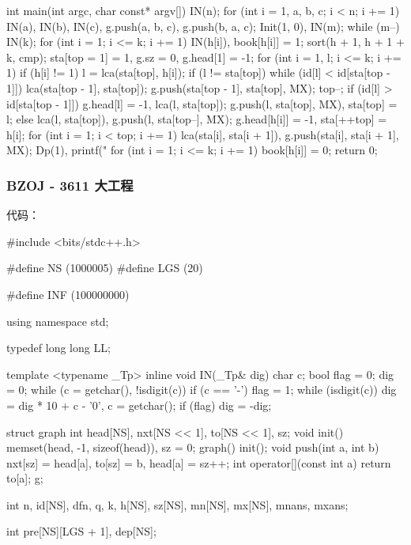 {\begin{cppcode}
int main(int argc, char const* argv[]) {
  IN(n);
  for (int i = 1, a, b, c; i < n; i += 1)
    IN(a), IN(b), IN(c), g.push(a, b, c), g.push(b, a, c);
  Init(1, 0), IN(m);
  while (m--) {
    IN(k);
    for (int i = 1; i <= k; i += 1) IN(h[i]), book[h[i]] = 1;
    sort(h + 1, h + 1 + k, cmp);
    sta[top = 1] = 1, g.sz = 0, g.head[1] = -1;
    for (int i = 1, l; i <= k; i += 1)
      if (h[i] != 1) {
        l = lca(sta[top], h[i]);
        if (l != sta[top]) {
          while (id[l] < id[sta[top - 1]]) {
            lca(sta[top - 1], sta[top]);
            g.push(sta[top - 1], sta[top], MX);
            top--;
          }
          if (id[l] > id[sta[top - 1]]) {
            g.head[l] = -1, lca(l, sta[top]);
            g.push(l, sta[top], MX), sta[top] = l;
          } else
            lca(l, sta[top]), g.push(l, sta[top--], MX);
        }
        g.head[h[i]] = -1, sta[++top] = h[i];
      }
    for (int i = 1; i < top; i += 1)
      lca(sta[i], sta[i + 1]), g.push(sta[i], sta[i + 1], MX);
    Dp(1), printf("%
    for (int i = 1; i <= k; i += 1) book[h[i]] = 0;
  }
  return 0;
}
\end{cppcode}

\subsubsection{BZOJ - 3611 大工程}

代码：

\begin{cppcode}
#include <bits/stdc++.h>

#define NS (1000005)
#define LGS (20)

#define INF (100000000)

using namespace std;

typedef long long LL;

template <typename _Tp>
inline void IN(_Tp& dig) {
  char c;
  bool flag = 0;
  dig = 0;
  while (c = getchar(), !isdigit(c))
    if (c == '-') flag = 1;
  while (isdigit(c)) dig = dig * 10 + c - '0', c = getchar();
  if (flag) dig = -dig;
}

struct graph {
  int head[NS], nxt[NS << 1], to[NS << 1], sz;
  void init() { memset(head, -1, sizeof(head)), sz = 0; }
  graph() { init(); }
  void push(int a, int b) { nxt[sz] = head[a], to[sz] = b, head[a] = sz++; }
  int operator[](const int a) { return to[a]; }
} g;

int n, id[NS], dfn, q, k, h[NS], sz[NS], mn[NS], mx[NS], mnans, mxans;

int pre[NS][LGS + 1], dep[NS];


\end{cppcode}}
